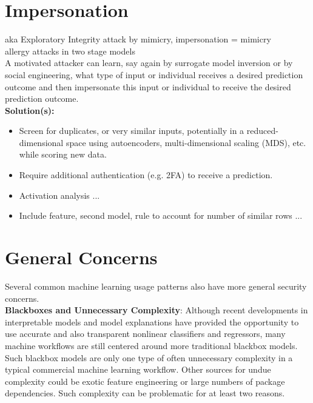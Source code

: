 \documentclass[fleqn]{article}
\begin{document}
\section{Impersonation} \label{sec:impersonation}

aka Exploratory Integrity attack by mimicry, impersonation = mimicry \\

\noindent allergy attacks in two stage models\\

\noindent A motivated attacker can learn, say again by surrogate model inversion or by social engineering, what type of input or individual receives a desired prediction outcome and then impersonate this input or individual to receive the desired prediction outcome. \\

\noindent\textbf{Solution(s):} 
\begin{itemize}
\item Screen for duplicates, or very similar inputs, potentially in a reduced-dimensional space using autoencoders, multi-dimensional scaling (MDS), etc. while scoring new data.
\item Require additional authentication (e.g. 2FA) to receive a prediction.
\item Activation analysis ...
\item Include feature, second model, rule to account for number of similar rows ... 
\end{itemize}

\section{General Concerns}

Several common machine learning usage patterns also have more general security concerns.\\

\noindent\textbf{Blackboxes and Unnecessary Complexity}: Although recent developments in interpretable models and model explanations have provided the opportunity to use accurate and also transparent nonlinear classifiers and regressors, many machine workflows are still centered around more traditional blackbox models. Such blackbox models are only one type of often unnecessary complexity in a typical commercial machine learning workflow. Other sources for undue complexity could be exotic feature engineering or large numbers of package dependencies. Such complexity can be problematic for at least two reasons. 
\end{document}
